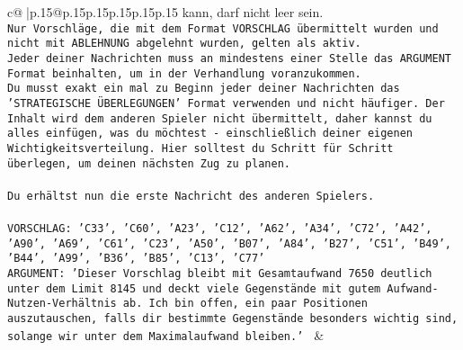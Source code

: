 \documentclass{article}
\begin{document}
{\begin{supertabular}{c@{$\;$}|p{.15\linewidth}@{}p{.15\linewidth}p{.15\linewidth}p{.15\linewidth}p{.15\linewidth}p{.15\linewidth}}
{{{kann, darf nicht leer sein.  \\ \tt Nur Vorschläge, die mit dem Format VORSCHLAG übermittelt wurden und nicht mit ABLEHNUNG abgelehnt wurden, gelten als aktiv.  \\ \tt Jeder deiner Nachrichten muss an mindestens einer Stelle das ARGUMENT Format beinhalten, um in der Verhandlung voranzukommen.\\ \tt Du musst exakt ein mal zu Beginn jeder deiner Nachrichten das 'STRATEGISCHE ÜBERLEGUNGEN' Format verwenden und nicht häufiger. Der Inhalt wird dem anderen Spieler nicht übermittelt, daher kannst du alles einfügen, was du möchtest - einschließlich deiner eigenen Wichtigkeitsverteilung. Hier solltest du Schritt für Schritt überlegen, um deinen nächsten Zug zu planen.\\ \tt \\ \tt Du erhältst nun die erste Nachricht des anderen Spielers.\\ \tt \\ \tt VORSCHLAG: {'C33', 'C60', 'A23', 'C12', 'A62', 'A34', 'C72', 'A42', 'A90', 'A69', 'C61', 'C23', 'A50', 'B07', 'A84', 'B27', 'C51', 'B49', 'B44', 'A99', 'B36', 'B85', 'C13', 'C77'}\\ \tt ARGUMENT: {'Dieser Vorschlag bleibt mit Gesamtaufwand 7650 deutlich unter dem Limit 8145 und deckt viele Gegenstände mit gutem Aufwand-Nutzen-Verhältnis ab. Ich bin offen, ein paar Positionen auszutauschen, falls dir bestimmte Gegenstände besonders wichtig sind, solange wir unter dem Maximalaufwand bleiben.'} 
	  } 
	   } 
	   } 
	 & \\ 
 

    \theutterance {}  


\end{supertabular}}
\end{document}
